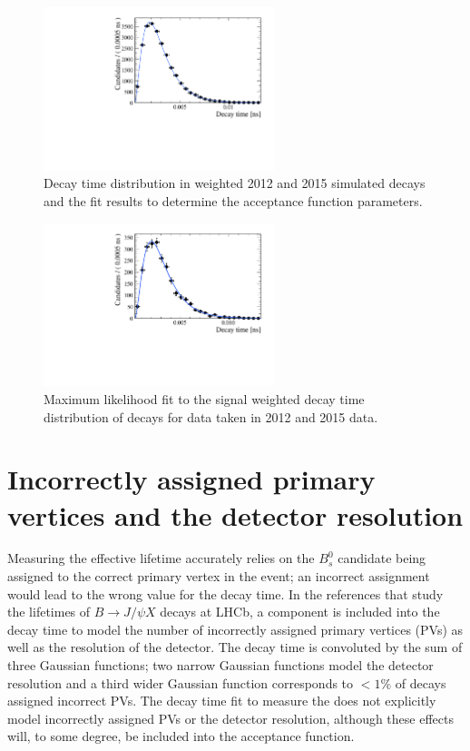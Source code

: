 \begin{figure}[tbp]
\centering
  \includegraphics[width=0.6\textwidth]{./Figs/LifetimeSystematics/Bs2KK_acceptance_Fit.pdf}
\caption{Decay time distribution in weighted 2012 and 2015 simulated decays and the fit  results to determine the acceptance function parameters. }
\label{fig:bskkacceptancefit}
\end{figure}

\begin{figure}[tbp]
\centering
  \includegraphics[width=0.6\textwidth]{./Figs/LifetimeSystematics/Bd2KPi_lifetime_fit.pdf}
\caption{Maximum likelihood fit to the signal weighted decay time distribution of \bskk decays for data taken in 2012 and 2015 data. }
\label{fig:bskklifetimefit}
\end{figure}

\section{Incorrectly assigned primary vertices and the detector resolution}
\label{sec:PVcheck}
Measuring the \bsmumu effective lifetime accurately relies on the $B^{0}_{s}$ candidate being assigned to the correct primary vertex in the event; an incorrect assignment would lead to the wrong value for the \bs decay time. %
In the references \cite{Aaij:2016ohx,Aaij:2015vza} that study the lifetimes of $B \to J/\psi X$ decays at LHCb, a component is included into the decay time \pdf to model the number of incorrectly assigned primary vertices (PVs) as well as the resolution of the detector. The decay time \pdf is convoluted by the sum of three Gaussian functions; two narrow Gaussian functions model the detector resolution  and a third wider Gaussian function corresponds to $<1\%$ of decays assigned incorrect PVs. The decay time fit to measure the \bsmumu \el does not explicitly model incorrectly assigned PVs or the detector resolution, although these effects will, to some degree, be included into the acceptance function. 

